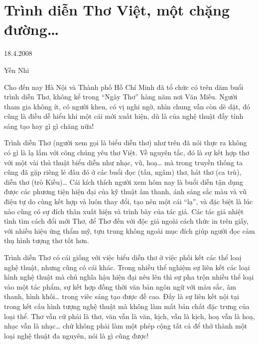 \documentclass[../main.tex]{subfiles}
\begin{document}
\chapter{Trình diễn Thơ Việt, một chặng đường…}

\begin{metadata}

\begin{flushright}18.4.2008\end{flushright}

Yến Nhi



\end{metadata}

\begin{multicols}{2}

Cho đến nay Hà Nội và Thành phố Hồ Chí Minh đã tổ chức có trên dăm buổi trình diễn Thơ, không kể trong “Ngày Thơ” hàng năm nơi Văn Miếu. Người tham gia không ít, có người khen, có vị nghi ngờ, nhìn chung vẫn còn dè dặt, đó cũng là điều dễ hiểu khi một cái mới xuất hiện, dù là của nghệ thuật đầy tính sáng tạo hay gì gì chăng nữa! 
 
Trình diễn Thơ (người xem gọi là biểu diễn thơ) như trên đã nói thực ra không có gì là lạ lắm với công chúng yêu thơ Việt. Về nguyên tắc, đó là sự kết hợp thơ với một vài thủ thuật biểu diễn như nhạc, vũ, hoạ… mà trong truyền thống ta cũng đã gặp riêng lẻ đâu đó ở các buổi đọc (tấu, ngâm) thơ, hát thơ (ca trù), diễn thơ (trò Kiều)…  Cái kích thích người xem hôm nay là buổi diễn tận dụng được các phương tiện hiện đại của kỹ thuật âm thanh, ánh sáng sắc màu và vũ điệu tự do cùng kết hợp và luôn thay đổi, tạo nên một cái “lạ”, và đặc biệt là lúc nào cũng có sự đích thân xuất hiện và trình bày của tác giả. Các tác giả nhiệt tình tìm cách đổi mới Thơ, để Thơ đến với độc giả ngoài cách thức in trên giấy, với nhiều hiệu ứng thẩm mỹ, tựu trung không ngoài mục đích giúp người đọc cảm thụ hình tượng thơ tốt hơn. 
 
Trình diễn Thơ có cái giống với việc biểu diễn thơ ở việc phối kết các thể loaị nghệ thuật, nhưng cũng có cái khác. Trong nhiều thể nghiệm sự liên kết các loại hình nghệ thuật mà chủ nghĩa hậu hiện đại nêu lên thì sự pha trộn nhiều thể loại vào một tác phẩm, sự kết hợp đồng thời văn bản ngôn ngữ với màu sắc, âm thanh, hình khối… trong viêc sáng tạo được đề cao. Đấy là sự liên kết nội tại trong kết cấu hình tượng nghệ thuật mà không làm mất bản chất đặc trưng của loại thể. Thơ vẫn cứ phải là thơ, văn vẫn là văn, kịch, vẫn là kịch, hoạ vẫn là hoạ, nhạc vẫn là nhạc… chứ không phải làm một phép cộng tất cả để thở thành một loại nghệ thuật đa nguyên, nói là gì cũng được! 
 

\end{multicols}
\end{document}
